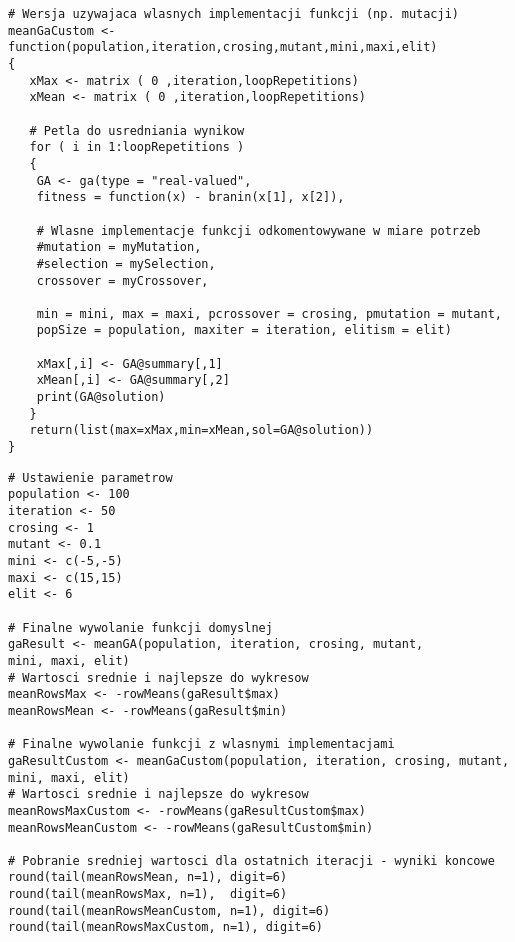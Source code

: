 \begin{lstlisting}[linewidth=15.4cm]
# Wersja uzywajaca wlasnych implementacji funkcji (np. mutacji)
meanGaCustom <- function(population,iteration,crosing,mutant,mini,maxi,elit)
{
   xMax <- matrix ( 0 ,iteration,loopRepetitions)   
   xMean <- matrix ( 0 ,iteration,loopRepetitions)  

   # Petla do usredniania wynikow
   for ( i in 1:loopRepetitions )
   {  
	GA <- ga(type = "real-valued",
	fitness = function(x) - branin(x[1], x[2]),
	
	# Wlasne implementacje funkcji odkomentowywane w miare potrzeb
	#mutation = myMutation,
	#selection = mySelection,
	crossover = myCrossover,
	
	min = mini, max = maxi, pcrossover = crosing, pmutation = mutant,
	popSize = population, maxiter = iteration, elitism = elit)
	
	xMax[,i] <- GA@summary[,1]
	xMean[,i] <- GA@summary[,2]
	print(GA@solution)
   }
   return(list(max=xMax,min=xMean,sol=GA@solution))
}
\end{lstlisting}


\begin{lstlisting}[linewidth=15.4cm]
# Ustawienie parametrow
population <- 100 
iteration <- 50
crosing <- 1
mutant <- 0.1
mini <- c(-5,-5)
maxi <- c(15,15)
elit <- 6

# Finalne wywolanie funkcji domyslnej
gaResult <- meanGA(population, iteration, crosing, mutant, 
mini, maxi, elit)
# Wartosci srednie i najlepsze do wykresow
meanRowsMax <- -rowMeans(gaResult$max)
meanRowsMean <- -rowMeans(gaResult$min)

# Finalne wywolanie funkcji z wlasnymi implementacjami 
gaResultCustom <- meanGaCustom(population, iteration, crosing, mutant, 
mini, maxi, elit)
# Wartosci srednie i najlepsze do wykresow
meanRowsMaxCustom <- -rowMeans(gaResultCustom$max)
meanRowsMeanCustom <- -rowMeans(gaResultCustom$min)

# Pobranie sredniej wartosci dla ostatnich iteracji - wyniki koncowe
round(tail(meanRowsMean, n=1), digit=6)
round(tail(meanRowsMax, n=1),  digit=6)
round(tail(meanRowsMeanCustom, n=1), digit=6)
round(tail(meanRowsMaxCustom, n=1), digit=6)

\end{lstlisting}

\newpage